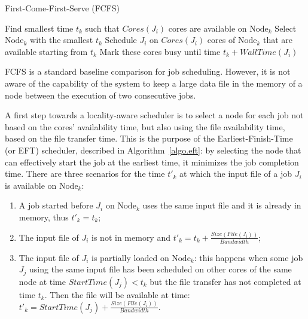 \documentclass[conference,10pt]{IEEEtran}
\newcommand{\Node}[1]{\ensuremath{\mathrm{Node}_{#1}}\xspace}
\newcommand{\file}{\ensuremath{\mathit{File}}\xspace}
\newcommand{\size}{\ensuremath{\mathit{Size}}\xspace}
\newcommand{\bandwidth}{\mathit{Bandwidth}\xspace}
\newcommand{\core}{\mathit{Cores}\xspace}
\newcommand{\walltime}{\mathit{WallTime}\xspace}
\newcommand{\start}{\mathit{StartTime}\xspace}
\newcommand{\nodeset}{\ensuremath{\mathbb{N}}\xspace}
\begin{document}
\begin{algorithm}[htbp]%
\caption{First-Come-First-Serve (FCFS)}\label{algo.fcfs}
\begin{algorithmic}[1]
        \ForEach{$\Node{k} \in \nodeset$}
        \State Find smallest time $t_k$ such that $\core(J_i)$ cores are available on \Node{k}\label{fcfs.ln.find}
        \EndFor
        \State Select \Node{k}  with the smallest $t_k$
        \State Schedule $J_i$ on $\core(J_i)$ cores of \Node{k} that are available starting from $t_k$
        \State Mark these cores busy until time $t_k +\walltime(J_i)$
	\EndFor
	\end{algorithmic}
\end{algorithm}


FCFS is a standard baseline comparison
for job scheduling. However, it is not aware of the capability of the
system to keep a large data file in the memory of a node between the execution of
two consecutive jobs.

A first step towards a locality-aware scheduler
is to select a node for each job not based on the cores' availability
time, but also using the file availability time, based on the file
transfer time. This is the purpose of the Earliest-Finish-Time (or
EFT) scheduler, described in Algorithm~\ref{algo.eft}: by selecting
the node that can effectively start the job at the earliest time, it
minimizes the job completion time. There are three scenarios for the
time $t'_k$ at which the input file of a job $J_i$ is available on
\Node{k}:
\begin{enumerate}
\item A job started before $J_i$ on \Node{k} uses the same input
  file and it is already in memory, thus $t'_k=t_k$;
\item The input file of $J_i$ is not in memory and
  $t'_k=t_k+\frac{\size(\file(J_i))}{\bandwidth}$;
\item The input file of $J_i$ is partially loaded on \Node{k}: this
  happens when some
  job $J_j$ using the same input file has been scheduled on other cores of
  the same node at time $\start(J_j)<t_k$ but the file transfer has not
  completed at time $t_k$. Then the file will be available at time:
  $t'_k = \start(J_j)+\frac{\size(\file(J_i))}{\bandwidth}.$
\end{enumerate}
\end{document}
